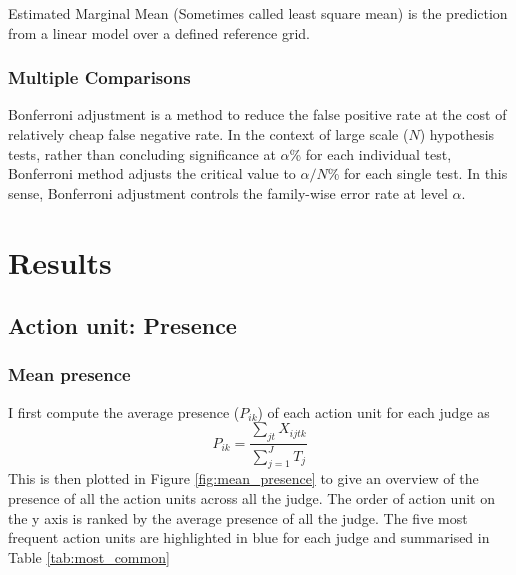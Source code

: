 \documentclass{monashthesis}
\begin{document}
Estimated Marginal Mean (Sometimes called least square mean) is the prediction from a linear model over a defined reference grid.

\hypertarget{multiple-comparisons}{%
\subsection{Multiple Comparisons}\label{multiple-comparisons}}

Bonferroni adjustment \autocite{rupert2012simultaneous} is a method to reduce the false positive rate at the cost of relatively cheap false negative rate. In the context of large scale (\(N\)) hypothesis tests, rather than concluding significance at \(\alpha\)\% for each individual test, Bonferroni method adjusts the critical value to \(\alpha/N\)\% for each single test. In this sense, Bonferroni adjustment controls the family-wise error rate at level \(\alpha\).

\hypertarget{results}{%
\chapter{Results}\label{results}}

\hypertarget{action-unit-presence}{%
\section{Action unit: Presence}\label{action-unit-presence}}

\hypertarget{mean-presence}{%
\subsection{Mean presence}\label{mean-presence}}

I first compute the average presence (\(P_{ik}\)) of each action unit for each judge as \[P_{ik} = \frac{\sum_{jt}X_{ijtk}}{\sum_{j = 1}^JT_j}\] This is then plotted in Figure \ref{fig:mean_presence} to give an overview of the presence of all the action units across all the judge. The order of action unit on the y axis is ranked by the average presence of all the judge. The five most frequent action units are highlighted in blue for each judge and summarised in Table \ref{tab:most_common}
\end{document}

